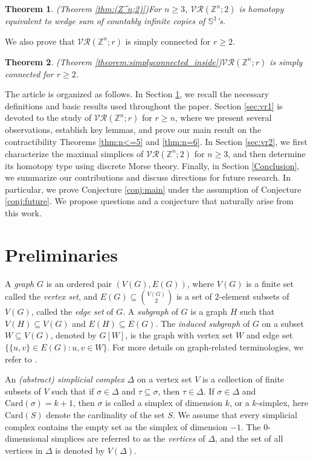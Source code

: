 \documentclass{amsart}
\newtheorem{theorem}{Theorem}[section]
\theoremstyle{definition}
\theoremstyle{remark}
\numberwithin{equation}{section}
\newcommand{\Sp}{\mathbb{S}}
\newcommand{\vr}[2]{\mathcal{VR}(#1;#2)}
\def\Z{{\mathbb{Z}}}
\begin{document}
\begin{theorem}{\rm (Theorem \ref{thm:(Z^n;2)})}\label{thm:r=2_Intro}
	For $n \geq 3$, $\vr{\Z^n}{2}$ is homotopy equivalent to wedge sum of countably infinite copies of $\Sp^3$'s.
\end{theorem}


We also prove that $\vr{\Z^n}{r}$ is simply connected for $r \geq 2$. 

\begin{theorem}{(Theorem \ref{theorem:simplyconnected_inside})}\label{thm:simplyconnected_intro}
	$\vr{\Z^n}{r}$ is simply connected for $r \geq 2$. 
	
\end{theorem}





The article is organized as follows. In Section \ref{Preliminaries}, we recall the necessary definitions and basic results used throughout the paper. Section \ref{sec:vr1} is devoted to the study of $\vr{\mathbb{Z}^n}{r}$ for $r \geq n$, where we present several observations, establish key lemmas, and prove our main result on the contractibility Theorems \ref{thm:n<=5} and \ref{thm:n=6}. In Section \ref{sec:vr2}, we first characterize the maximal simplices of $\vr{\mathbb{Z}^n}{2}$ for $n \geq 3$, and then determine its homotopy type using discrete Morse theory. Finally, in Section \ref{Conclusion}, we summarize our contributions and discuss directions for future research. In particular, we prove Conjecture \ref{conj:main} under the assumption of Conjecture \ref{conj:future}. We propose questions and a conjecture that naturally arise from this work.

\section{Preliminaries}\label{Preliminaries}
A {\em graph} $G$ is an ordered pair $(V(G), E(G))$, where $V(G)$ is a finite set called the {\em vertex set}, and $E(G) \subseteq \binom{V(G)}{2}$ is a set of $2$-element subsets of $V(G)$, called the {\em edge set} of $G$. A {\em subgraph} of $G$ is a graph $H$ such that $V(H) \subseteq V(G)$ and $E(H) \subseteq E(G)$. The {\em induced subgraph} of $G$ on a subset $W \subseteq V(G)$, denoted by $G[W]$, is the graph with vertex set $W$ and edge set $\{\{u,v\} \in E(G) : u,v \in W\}$. For more details on graph-related terminologies, we refer to \cite{Douglas}.



An {\em (abstract) simplicial complex} $\Delta$ on a vertex set $V$ is a collection of finite subsets of $V$ such that if $\sigma \in \Delta$ and $\tau \subseteq \sigma$, then $\tau \in \Delta$. If $\sigma \in \Delta$ and $\mathrm{Card}(\sigma) = k+1$, then $\sigma$ is called a simplex of dimension $k$, or a $k$-simplex, here $\mathrm{Card}(S)$ denote the cardinality of the set $S$.  We assume that every simplicial complex contains the empty set as the simplex of dimension $-1$. The $0$-dimensional simplices are referred to as the {\em vertices} of $\Delta$, and the set of all vertices in $\Delta$ is denoted by $V(\Delta)$. 
\end{document}
